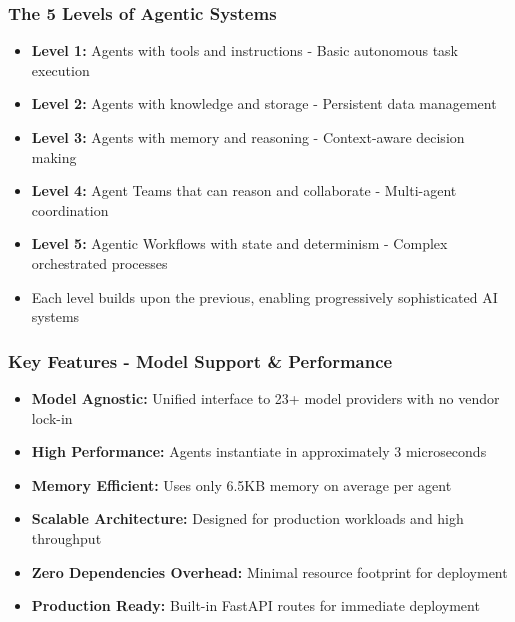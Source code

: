 \begin{frame}[fragile]\frametitle{The 5 Levels of Agentic Systems}
      \begin{itemize}
	\item \textbf{Level 1:} Agents with tools and instructions - Basic autonomous task execution
	\item \textbf{Level 2:} Agents with knowledge and storage - Persistent data management
	\item \textbf{Level 3:} Agents with memory and reasoning - Context-aware decision making
	\item \textbf{Level 4:} Agent Teams that can reason and collaborate - Multi-agent coordination
	\item \textbf{Level 5:} Agentic Workflows with state and determinism - Complex orchestrated processes
	\item Each level builds upon the previous, enabling progressively sophisticated AI systems
	  \end{itemize}
\end{frame}

\begin{frame}[fragile]\frametitle{Key Features - Model Support \& Performance}
      \begin{itemize}
	\item \textbf{Model Agnostic:} Unified interface to 23+ model providers with no vendor lock-in
	\item \textbf{High Performance:} Agents instantiate in approximately 3 microseconds
	\item \textbf{Memory Efficient:} Uses only 6.5KB memory on average per agent
	\item \textbf{Scalable Architecture:} Designed for production workloads and high throughput
	\item \textbf{Zero Dependencies Overhead:} Minimal resource footprint for deployment
	\item \textbf{Production Ready:} Built-in FastAPI routes for immediate deployment
	  \end{itemize}
\end{frame}

